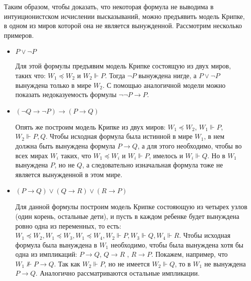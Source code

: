 Таким образом, чтобы доказать, что некоторая формула не выводима в 
интуиционистском исчислении высказываний, можно предъявить модель Крипке,
в одном из миров которой она не является вынужденной.
Рассмотрим несколько примеров.


\begin{itemize}

\item $P \vee\neg P$

\begin{center} \end{center}

Для этой формулы предъявим модель Крипке состоящую из двух миров, таких что:  
$W_1 \preceq W_2$ и $W_2 \Vdash P$. Тогда $\neg P$ вынуждена нигде, 
а $P \vee\neg P$ вынуждена только в мире $W_2$. С помощью аналогичной модели 
можно показать недоказуемость 
формулы $\neg\neg P \rightarrow P$.

\item $(\neg Q \rightarrow \neg P) \rightarrow (P \rightarrow Q)$

\begin{center} \end{center}

Опять же построим модель Крипке из двух миров: 
$W_1 \preceq W_2$,  $W_1 \Vdash P$,  $W_2 \Vdash P, Q$. Чтобы исходная
формула была истинной в мире $W_1$, в нем должна быть вынуждена 
формула $P \rightarrow Q$, а для этого необходимо, чтобы во всех мирах
$W_i$ таких, что $W_1 \preceq W_i$ и $W_i \Vdash P$, имелось и $W_i \Vdash Q$.
Но в $W_1$  вынуждена $P$, но не  $Q$, а следовательно изначальная формула тоже
не является вынужденной в этом мире.

\item $(P \rightarrow Q) \vee (Q \rightarrow R) \vee (R \rightarrow P)$

\begin{center} \end{center}

Для данной формулы построим модель Крипке состояющую из четырех узлов (один корень, остальные дети), 
и пусть в каждом ребенке будет вынуждена ровно одна из переменных, то есть: 
$W_1 \preceq W_2, W_1 \preceq W_3, W_1 \preceq W_4, 
W_2 \Vdash P, W_3 \Vdash Q, W_4 \Vdash R$.  
Чтобы исходная формула была вынуждена в $W_1$ необходимо, чтобы была вынуждена хотя бы одна
из импликаций: $P \rightarrow Q$,  $Q \rightarrow R$ , $R \rightarrow P$. 
Покажем, например, что $W_1 \nVdash P \rightarrow Q$. 
Так как $W_2 \Vdash P$, но не имеется $W_2 \Vdash Q$, то в $W_1$ не вынуждена $P \rightarrow Q$.
Аналогично рассматриваются остальные импликации.

\end{itemize}

